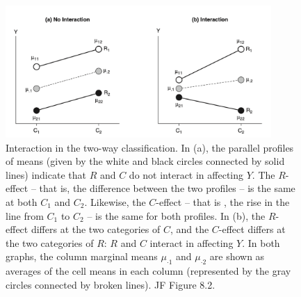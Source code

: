 %
\begin{figure}[H]
	\begin{center}
		\includegraphics[width=0.9\textwidth]{Lecture25/JF_8_2}
		\caption{
			Interaction in the two-way classification.  In (a), the parallel profiles of means (given by the white and black circles connected by solid lines) indicate that $R$ and $C$ do not interact in affecting $Y$.
			The $R$-effect -- that is, the difference between the two profiles -- is the same at both $C_1$ and $C_2$.
			Likewise, the $C$-effect -- that is , the rise in the line from $C_1$ to $C_2$ -- is the same for both profiles.
			In (b), the $R$-effect differs at the two categories of $C$, and the $C$-effect differs at the two categories of $R$: $R$ and $C$ interact in affecting $Y$.
			In both graphs, the column marginal means $\mu_{\cdot 1}$ and $\mu_{\cdot 2}$ are shown as averages of the cell means in each column (represented by the gray circles connected by broken lines).
			JF Figure 8.2.}
		\label{fig:JF_8_2}
	\end{center}
\end{figure}
%
